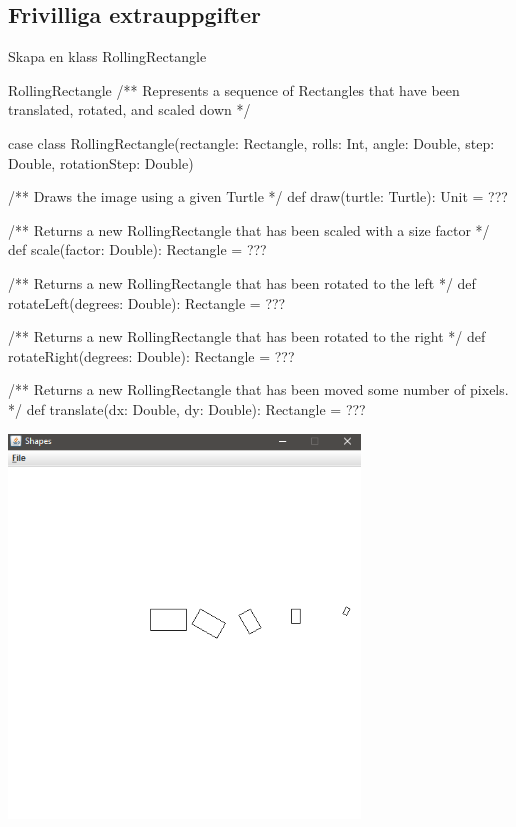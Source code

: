 \subsection{Frivilliga extrauppgifter}


\Task Skapa en klass RollingRectangle


\begin{ScalaSpec}{RollingRectangle}
/** Represents a sequence of Rectangles that have been translated,
       rotated, and scaled down */

case class RollingRectangle(rectangle: Rectangle,
                            rolls: Int,
                            angle: Double,
                            step: Double,
                            rotationStep: Double) {

  /** Draws the image using a given Turtle */
  def draw(turtle: Turtle): Unit = ???

  /** Returns a new RollingRectangle that has been scaled with a size factor */
  def scale(factor: Double): Rectangle = ???

  /** Returns a new RollingRectangle that has been rotated to the left */
  def rotateLeft(degrees: Double): Rectangle = ???

  /** Returns a new RollingRectangle that has been rotated to the right */
  def rotateRight(degrees: Double): Rectangle = ???

  /** Returns a new RollingRectangle that has been moved some number of pixels. */
  def translate(dx: Double, dy: Double): Rectangle = ???
}
\end{ScalaSpec}

\includegraphics[width=0.7\textwidth]{../img/w06-lab/RollingRectangle.png}




